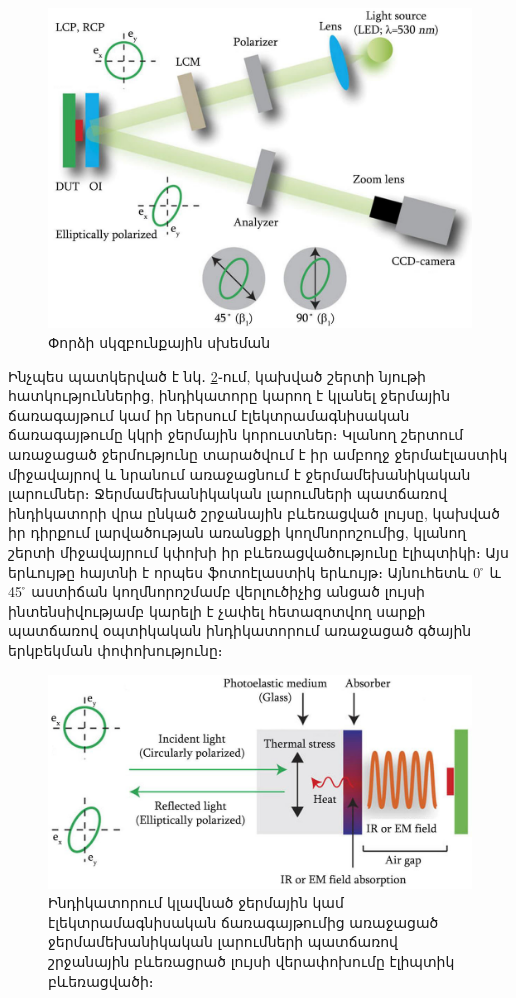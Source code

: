 \documentclass[12pt, fleqn]{report}
\begin{document}
\begin{figure}
    \centering
    \includegraphics[width=1.0\textwidth]{data/TEOIM/0.jpg}
    \caption{Փորձի սկզբունքային սխեման}
    \label{fig:TEOIM-scheme}
\end{figure}
Ինչպես պատկերված է նկ․ \ref{fig:TEOIM-photoelasticity}֊ում, կախված շերտի նյութի հատկություններից, ինդիկատորը կարող է կլանել ջերմային ճառագայթում կամ իր ներսում էլեկտրամագնիսական ճառագայթումը կկրի ջերմային կորուստներ։ Կլանող շերտում առաջացած ջերմությունը տարածվում է իր ամբողջ ջերմաէլաստիկ միջավայրով և նրանում առաջացնում է ջերմամեխանիկական լարումներ։ Ջերմամեխանիկական լարումների պատճառով ինդիկատորի վրա ընկած շրջանային բևեռացված լույսը, կախված իր դիրքում լարվածության առանցքի կողմնորոշումից, կլանող շերտի միջավայրում կփոխի իր բևեռացվածությունը էլիպտիկի։ Այս երևույթը հայտնի է որպես ֆոտոէլաստիկ երևույթ։ Այնուհետև 0 ̊ և 45 ̊ աստիճան կողմնորոշմամբ վերլուծիչից անցած լույսի ինտենսիվությամբ կարելի է չափել հետազոտվող սարքի պատճառով օպտիկական ինդիկատորում առաջացած գծային երկբեկման փոփոխությունը։

\begin{figure}
    \centering
    \includegraphics[width=1.0\textwidth]{data/TEOIM/1.jpg}
    \caption{Ինդիկատորում կլավնած ջերմային կամ էլեկտրամագնիսական ճառագայթումից առաջացած ջերմամեխանիկական լարումների պատճառով շրջանային բևեռացրած լույսի վերափոխումը էլիպտիկ բևեռացվածի։}
    \label{fig:TEOIM-photoelasticity}
\end{figure}
\end{document}
